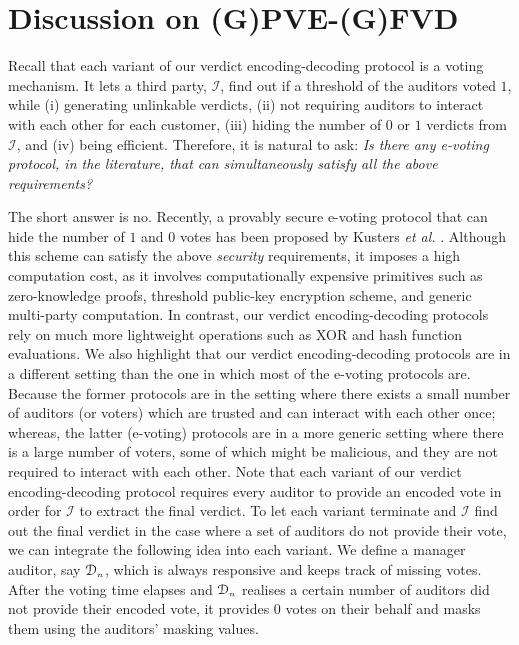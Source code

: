 \vspace{-5mm}
\section{Discussion on (G)PVE-(G)FVD}\label{sec:: Further-Discussion-on-the-Encoding-decoding-Protocol}



Recall that each variant of our verdict encoding-decoding protocol is a voting mechanism. It  lets a third party, $\mathcal{I}$, find out if a threshold of the auditors voted $1$, while (i) generating unlinkable verdicts, (ii) not requiring auditors to interact with each other for each customer, (iii) hiding the number of $0$ or $1$ verdicts from  $\mathcal{I}$, and (iv) being  efficient. Therefore, it is natural to ask: \emph{Is there   any {e-voting} protocol, in the literature, that can  simultaneously satisfy all the above requirements?}



The short answer is no. Recently, a provably secure  e-voting protocol that can hide the number of $1$ and $0$ votes has been proposed by K{u}sters \textit{et al.} \cite{KustersL00020}. Although this scheme can satisfy the above \emph{security} requirements, it imposes a high computation cost, as  it involves computationally expensive primitives such as zero-knowledge proofs, threshold public-key encryption scheme, and generic multi-party computation. In contrast, our verdict encoding-decoding protocols rely on much more lightweight operations such as XOR and hash function evaluations.  We also  highlight that our verdict encoding-decoding protocols are in a different setting than the one in which most of the e-voting protocols are. Because the former protocols are in the setting where there exists a small number of auditors (or voters) which are trusted and can interact with each other once; whereas, the latter (e-voting) protocols are in a more  generic setting where there is a large number of  voters, some of which might be malicious, and they are not  required to interact with each other. 
%
Note that each variant of our verdict encoding-decoding protocol requires every auditor to provide an encoded vote  in order for $\mathcal{I}$ to extract the final verdict. To let each variant terminate and $\mathcal{I}$ find out the final verdict in the case where a  set of  auditors do not provide their vote, we can integrate the    following idea into each variant. We define a manager auditor, say $\mathcal{D}_{\scriptscriptstyle n}$, which is always responsive and keeps track of missing votes. After the voting time elapses and $\mathcal{D}_{\scriptscriptstyle n}$ realises a certain  number of auditors did not provide their encoded vote, it provides $0$ votes on their behalf and masks them using the  auditors' masking values. 









